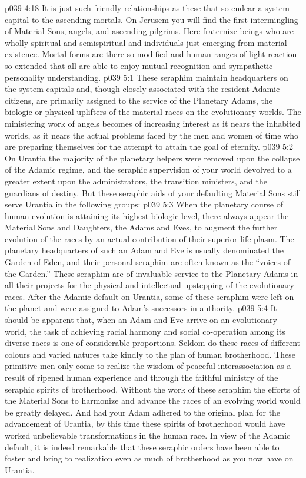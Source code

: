 \vs p039 4:18 It is just such friendly relationships as these that so endear a system capital to the ascending mortals. On Jerusem you will find the first intermingling of Material Sons, angels, and ascending pilgrims. Here fraternize beings who are wholly spiritual and semispiritual and individuals just emerging from material existence. Mortal forms are there so modified and human ranges of light reaction so extended that all are able to enjoy mutual recognition and sympathetic personality understanding.
\vs p039 5:1 These seraphim maintain headquarters on the system capitals and, though closely associated with the resident Adamic citizens, are primarily assigned to the service of the Planetary Adams, the biologic or physical uplifters of the material races on the evolutionary worlds. The ministering work of angels becomes of increasing interest as it nears the inhabited worlds, as it nears the actual problems faced by the men and women of time who are preparing themselves for the attempt to attain the goal of eternity.
\vs p039 5:2 On Urantia the majority of the planetary helpers were removed upon the collapse of the Adamic regime, and the seraphic supervision of your world devolved to a greater extent upon the administrators, the transition ministers, and the guardians of destiny. But these seraphic aids of your defaulting Material Sons still serve Urantia in the following groups:
\vs p039 5:3 \bibnobreakspace {} When the planetary course of human evolution is attaining its highest biologic level, there always appear the Material Sons and Daughters, the Adams and Eves, to augment the further evolution of the races by an actual contribution of their superior life plasm. The planetary headquarters of such an Adam and Eve is usually denominated the Garden of Eden, and their personal seraphim are often known as the “voices of the Garden.” These seraphim are of invaluable service to the Planetary Adams in all their projects for the physical and intellectual upstepping of the evolutionary races. After the Adamic default on Urantia, some of these seraphim were left on the planet and were assigned to Adam’s successors in authority.
\vs p039 5:4 \bibnobreakspace {} It should be apparent that, when an Adam and Eve arrive on an evolutionary world, the task of achieving racial harmony and social co\hyp{}operation among its diverse races is one of considerable proportions. Seldom do these races of different colours and varied natures take kindly to the plan of human brotherhood. These primitive men only come to realize the wisdom of peaceful interassociation as a result of ripened human experience and through the faithful ministry of the seraphic spirits of brotherhood. Without the work of these seraphim the efforts of the Material Sons to harmonize and advance the races of an evolving world would be greatly delayed. And had your Adam adhered to the original plan for the advancement of Urantia, by this time these spirits of brotherhood would have worked unbelievable transformations in the human race. In view of the Adamic default, it is indeed remarkable that these seraphic orders have been able to foster and bring to realization even as much of brotherhood as you now have on Urantia.
